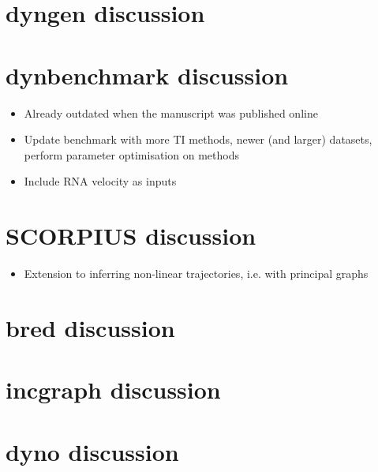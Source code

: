 

%

%

\section{dyngen discussion}

\section{dynbenchmark discussion}
\begin{itemize}
	\item Already outdated when the manuscript was published online
	\item Update benchmark with more TI methods, newer (and larger) datasets, perform parameter optimisation on methods
	\item Include RNA velocity as inputs
\end{itemize}

\section{SCORPIUS discussion}
\begin{itemize}
	\item Extension to inferring non-linear trajectories, i.e. with principal graphs
\end{itemize}

\section{bred discussion}

\section{incgraph discussion}

\section{dyno discussion}
